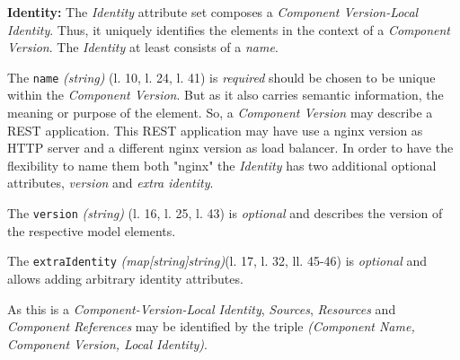 \textbf{Identity:} The \emph{Identity} attribute set composes a \emph{Component Version-Local Identity}. Thus, it uniquely identifies the elements in the context of a \emph{Component Version}. The \emph{Identity} at least consists of a \emph{name}.\par 
The \lstinline|name| \emph{(string)}  (l. 10, l. 24, l. 41) is \emph{required} should be chosen to be unique within the \emph{Component Version}. But as it also carries semantic information, the meaning or purpose of the element. So, a \emph{Component Version} may describe a REST application. This REST application may have use a nginx version as HTTP server and a different nginx version as load balancer. In order to have the flexibility to name them both "nginx" the \emph{Identity} has two additional optional attributes, \emph{version} and \emph{extra identity}.\par
The \lstinline|version| \emph{(string)} (l. 16, l. 25, l. 43) is \emph{optional} and describes the version of the respective model elements.\par
The \lstinline|extraIdentity| \emph{(map[string]string)}(l. 17, l. 32, ll. 45-46) is \emph{optional} and allows adding arbitrary identity attributes.\par
As this is a \emph{Component-Version-Local Identity}, \emph{Sources}, \emph{Resources} and \emph{Component References} may be identified by the triple \emph{({Component Name}, {Component Version}, {Local Identity})}.\\


